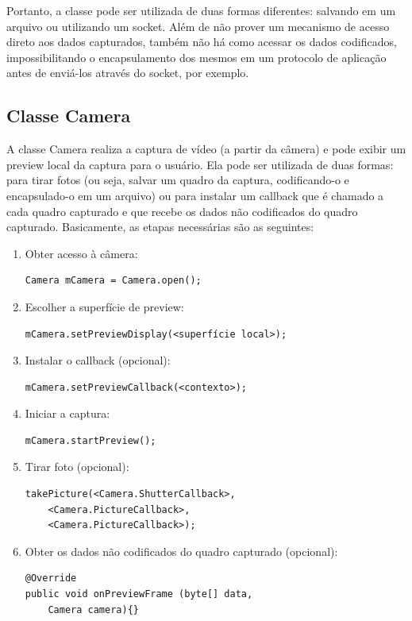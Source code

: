 \documentclass{acm_proc_article-sp}
\begin{document}
Portanto, a classe pode ser utilizada de duas formas diferentes: salvando em um arquivo ou utilizando um socket. Além de não prover um mecanismo de acesso direto aos dados capturados, também não há como acessar os dados codificados, impossibilitando o encapsulamento dos mesmos em um protocolo de aplicação antes de enviá-los através do socket, por exemplo. 

\subsection{Classe Camera}
A classe Camera realiza a captura de vídeo (a partir da câmera) e pode exibir um preview local da captura para o usuário. Ela pode ser utilizada de duas formas: para tirar fotos (ou seja, salvar um quadro da captura, codificando-o e encapsulado-o em um arquivo) ou para instalar um callback que é chamado a cada quadro capturado e que recebe os dados não codificados do quadro capturado. Basicamente, as etapas necessárias são as seguintes:


\begin{enumerate}
 \item Obter acesso à câmera:
  \begin{verbatim}
Camera mCamera = Camera.open();
  \end{verbatim}
 \item Escolher a superfície de preview:
  \begin{verbatim}
mCamera.setPreviewDisplay(<superfície local>);
  \end{verbatim}
 \item Instalar o callback (opcional):
  \begin{verbatim}
mCamera.setPreviewCallback(<contexto>);
  \end{verbatim}
 \item Iniciar a captura:
  \begin{verbatim}
mCamera.startPreview();
  \end{verbatim}
 \item Tirar foto (opcional):
  \begin{verbatim}
takePicture(<Camera.ShutterCallback>,
    <Camera.PictureCallback>,
    <Camera.PictureCallback>);
  \end{verbatim}
 \item Obter os dados não codificados do quadro capturado (opcional):
  \begin{verbatim}
@Override
public void onPreviewFrame (byte[] data, 
    Camera camera){}
  \end{verbatim}
\end{enumerate}
\end{document}
